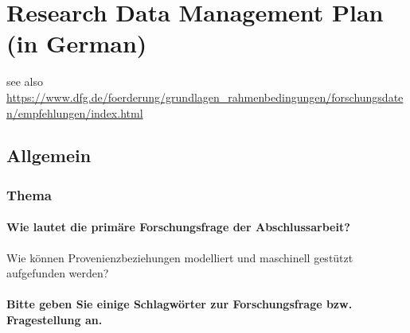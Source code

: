\chapter{Research Data Management Plan (in German)}
\label{chap:DMP}


see also \url{https://www.dfg.de/foerderung/grundlagen_rahmenbedingungen/forschungsdaten/empfehlungen/index.html}


\newcommand{\tocless}{\relax}

\setcounter{secnumdepth}{\subsubsectionnumdepth}
\section{Allgemein}

\subsection{Thema}

\subsubsection{Wie lautet die primäre Forschungsfrage der Abschlussarbeit?}

Wie können Provenienzbeziehungen modelliert und maschinell gestützt aufgefunden werden?

\subsubsection{Bitte geben Sie einige Schlagwörter zur Forschungsfrage bzw. Fragestellung an.}

